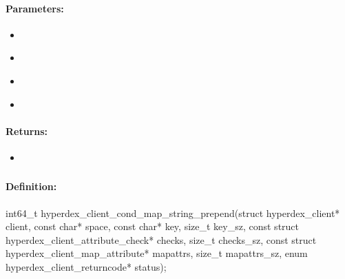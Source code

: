 \paragraph{Parameters:}
\begin{itemize}[noitemsep]
\item {}\\

\item {}\\

\item {}\\

\item {}\\

\end{itemize}

\paragraph{Returns:}
\begin{itemize}[noitemsep]
\item {}\\

\end{itemize}

\pagebreak
\subsubsection{}
\label{api:c:cond_map_string_prepend}


\paragraph{Definition:}
\begin{ccode}
int64_t hyperdex_client_cond_map_string_prepend(struct hyperdex_client* client,
        const char* space,
        const char* key, size_t key_sz,
        const struct hyperdex_client_attribute_check* checks, size_t checks_sz,
        const struct hyperdex_client_map_attribute* mapattrs, size_t mapattrs_sz,
        enum hyperdex_client_returncode* status);
\end{ccode}


